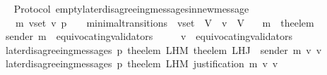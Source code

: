 \begin{isabellebody}
%
\isadelimproof
\ \ %
\endisadelimproof
%
\isatagproof
{}\isamarkupfalse%
%
\endisatagproof
{\isafoldproof}%
%
\isadelimproof
\isanewline
%
\endisadelimproof
\isanewline
\isanewline
{}\isamarkupfalse%
\ {\isacharparenleft}\ Protocol{\isacharparenright}\ empty{\isacharunderscore}later{\isacharunderscore}disagreeing{\isacharunderscore}messages{\isacharunderscore}in{\isacharunderscore}new{\isacharunderscore}message\ {\isacharcolon}\isanewline
\ \ {\isachardoublequoteopen}{\isasymforall}\ {\isasymsigma}\ {\isasymsigma}{\isacharprime}\ m{\isacharprime}\ v{\isacharunderscore}set\ v\ p{\isachardot}\ {\isacharparenleft}{\isasymsigma}{\isacharcomma}\ {\isasymsigma}{\isacharprime}{\isacharparenright}\ {\isasymin}\ minimal{\isacharunderscore}transitions\ {\isasymand}\ v{\isacharunderscore}set\ {\isasymsubseteq}\ V\ {\isasymand}\ v\ {\isasymin}\ V\isanewline
\ \ {\isasymlongrightarrow}\ m{\isacharprime}\ {\isacharequal}\ the{\isacharunderscore}elem\ {\isacharparenleft}{\isasymsigma}{\isacharprime}\ {\isacharminus}\ {\isasymsigma}{\isacharparenright}\isanewline
\ \ {\isasymlongrightarrow}\ sender\ m{\isacharprime}\ {\isasymnotin}\ equivocating{\isacharunderscore}validators\ {\isasymsigma}{\isacharprime}\ \isanewline
\ \ {\isasymlongrightarrow}\ v\ {\isasymnotin}\ equivocating{\isacharunderscore}validators\ {\isasymsigma}\isanewline
\ \ {\isasymlongrightarrow}\ later{\isacharunderscore}disagreeing{\isacharunderscore}messages\ {\isacharparenleft}p{\isacharcomma}\ {\isacharparenleft}the{\isacharunderscore}elem\ {\isacharparenleft}L{\isacharunderscore}H{\isacharunderscore}M\ {\isacharparenleft}the{\isacharunderscore}elem\ {\isacharparenleft}L{\isacharunderscore}H{\isacharunderscore}J\ {\isasymsigma}\ {\isacharparenleft}sender\ m{\isacharprime}{\isacharparenright}{\isacharparenright}{\isacharparenright}\ v{\isacharparenright}{\isacharparenright}{\isacharcomma}\ v{\isacharcomma}\ {\isasymsigma}{\isacharparenright}\ {\isacharequal}\ {\isasymemptyset}\isanewline
\ \ {\isasymlongrightarrow}\ later{\isacharunderscore}disagreeing{\isacharunderscore}messages\ {\isacharparenleft}p{\isacharcomma}\ {\isacharparenleft}the{\isacharunderscore}elem\ {\isacharparenleft}L{\isacharunderscore}H{\isacharunderscore}M\ {\isacharparenleft}justification\ m{\isacharprime}{\isacharparenright}\ v{\isacharparenright}{\isacharparenright}{\isacharcomma}\ v{\isacharcomma}\ {\isasymsigma}{\isacharparenright}\ {\isacharequal}\ {\isasymemptyset}{\isachardoublequoteclose}\isanewline
%
\isadelimproof
\ \ %
\endisadelimproof
%
\isatagproof
{}\isamarkupfalse%

\end{isabellebody}
